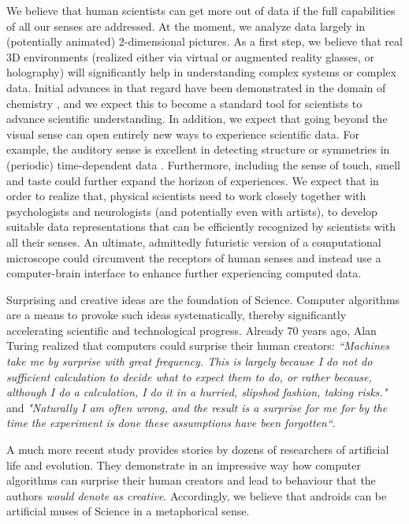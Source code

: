   We believe that human scientists can get more out of data if the full capabilities of all our senses are addressed. At the moment, we analyze data largely in (potentially animated) 2-dimensional pictures. As a first step, we believe that real 3D environments (realized either via virtual or augmented reality glasses, or holography) will significantly help in understanding complex systems or complex data. Initial advances in that regard have been demonstrated in the domain of chemistry \cite{o2018sampling, probst2018exploring, schmid2020structural}, and we expect this to become a standard tool for scientists to advance scientific understanding. In addition, we expect that going beyond the visual sense can open entirely new ways to experience scientific data. For example, the auditory sense is excellent in detecting structure or symmetries in (periodic) time-dependent data \cite{castelvecchi2021sound}. Furthermore, including the sense of touch, smell and taste could further expand the horizon of experiences. We expect that in order to realize that, physical scientists need to work closely together with psychologists and neurologists (and potentially even with artists), to develop suitable data representations that can be efficiently recognized by scientists with all their senses. An ultimate, admittedly futuristic version of a computational microscope could circumvent the receptors of human senses and instead use a computer-brain interface to enhance further experiencing computed data.

Surprising and creative ideas are the foundation of Science. Computer algorithms are a means to provoke such ideas systematically, thereby significantly accelerating scientific and technological progress. Already 70 years ago,  Alan Turing realized that computers could surprise their human creators: \textit{``Machines take me by surprise with great frequency. This is largely because I do not do sufficient calculation to decide what to expect them to do, or rather because, although I do a calculation, I do it in a hurried, slipshod fashion, taking risks."} and \textit{"Naturally I am often wrong, and the result is a surprise for me for by the time the experiment is done these assumptions have been forgotten``}\cite{turing1950computing}.

A much more recent study provides stories by dozens of researchers of artificial life and evolution. They demonstrate in an impressive way how computer algorithms can surprise their human creators and lead to behaviour that the authors \textit{would denote as creative}\cite{lehman2020surprising}. Accordingly, we believe that androids can be artificial muses of Science in a metaphorical sense.


